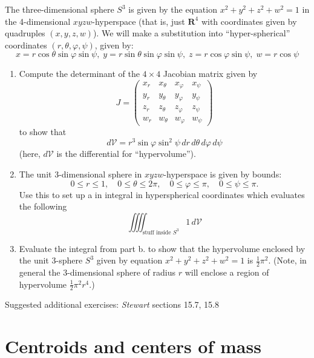 \documentclass[12pt]{article}
\numberwithin{equation}{subsection}
\numberwithin{figure}{subsection}
\theoremstyle{note}
\begin{document}
{\begin{enumerate}[label=\arabic*.]
The three-dimensional sphere $S^3$ is given by the equation $x^2+y^2+z^2+w^2=1$ in the 4-dimensional $xyzw$-hyperspace (that is, just $\mathbf{R}^4$ with coordinates given by quadruples $(x,y,z,w)$). We will make a substitution into ``hyper-spherical'' coordinates $(r,\theta, \varphi, \psi)$, given by:
\[x=r \cos\theta \sin \varphi \sin \psi, \; y=r \sin \theta \sin \varphi \sin \psi , \; z=r \cos \varphi\sin \psi , \; w=r\cos \psi\]

\begin{enumerate}
	\item Compute the determinant of the $4\times 4$ Jacobian matrix given by 
	\[ J=\begin{pmatrix} x_r & x_{\theta} & x_{\varphi} & x_{\psi} \\
	y_r & y_{\theta} & y_{\varphi} & y_{\psi}\\
	z_r & z_{\theta} & z_{\varphi} & z_{\psi}\\
	w_r & w_{\theta} & w_{\varphi} & w_{\psi}
	\end{pmatrix}\]
	to show that \[d\mathcal{V}= r^3 \sin \varphi  \sin^{2}\psi \, dr\, d\theta \, d\varphi \, d\psi\] (here, $d\mathcal{V}$ is the differential for ``hypervolume'').
	\item The unit $3$-dimensional sphere in $xyzw$-hyperspace is given by bounds: \[0\leq r \leq 1, \quad  0\leq \theta \leq 2\pi, \quad 0\leq \varphi \leq \pi, \quad 0\leq \psi \leq \pi.\] Use this to set up a in integral in hyperspherical coordinates which evaluates the following 
	\[ \iiiint_{\text{stuff inside $S^3$}} 1\, d\mathcal{V}\] 
	\item Evaluate the integral from part b. to show that the hypervolume enclosed by the unit 3-sphere $S^3$ given by equation $x^2+y^2+z^2+w^2=1$ is $\frac{1}{2}\pi^2$. (Note, in general the $3$-dimensional sphere of radius $r$ will enclose a region of hypervolume $\frac{1}{2}\pi^2 r^4$.)
\end{enumerate}
\end{enumerate}
Suggested additional exercises: \textit{Stewart} sections 15.7, 15.8




\section{Centroids and centers of mass}

}
\end{document}
